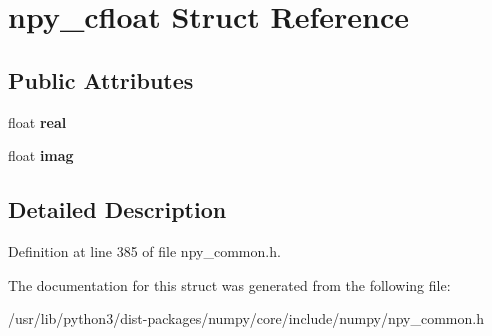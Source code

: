 \hypertarget{structnpy__cfloat}{}\section{npy\+\_\+cfloat Struct Reference}
\label{structnpy__cfloat}
\subsection*{Public Attributes}
\begin{DoxyCompactItemize}
\item 
float {\bfseries real}\hypertarget{structnpy__cfloat_a363207c3f19ae8b58dedc9fcb350b0c9}{}\label{structnpy__cfloat_a363207c3f19ae8b58dedc9fcb350b0c9}

\item 
float {\bfseries imag}\hypertarget{structnpy__cfloat_abbc4ae5df64e7058b3c0185c00b8d455}{}\label{structnpy__cfloat_abbc4ae5df64e7058b3c0185c00b8d455}

\end{DoxyCompactItemize}


\subsection{Detailed Description}


Definition at line 385 of file npy\+\_\+common.\+h.



The documentation for this struct was generated from the following file\+:\begin{DoxyCompactItemize}
\item 
/usr/lib/python3/dist-\/packages/numpy/core/include/numpy/npy\+\_\+common.\+h\end{DoxyCompactItemize}
